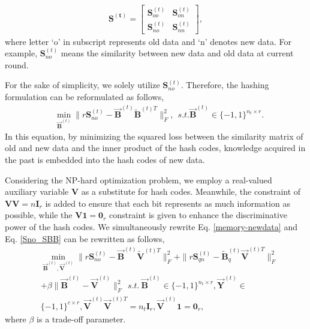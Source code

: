 \documentclass[final]{beamer}
\newlength{\colwidth}
\begin{document}
\begin{frame}[t]
\begin{columns}[t]
\begin{column}{\colwidth}
					\begin{equation}
						\begin{aligned}
							\mathbf{S^{(t)}} = \begin{bmatrix}  \mathbf{S}_{oo}^{(t)}& \mathbf{S}_{on}^{(t)}\\  \mathbf{S}_{no}^{(t)}& \mathbf{S}_{nn}^{(t)}\end{bmatrix},
						\end{aligned}
						\label{S_online_scenario}
					\end{equation}
					where letter `o' in subscript represents old data and `n' denotes new data. For example, $\mathbf{S}_{no}^{(t)}$ means the similarity between new data and old data at current round.
					
					
					For the sake of simplicity, we solely utilize $\mathbf{S}_{no}^{(t)}$. Therefore, the hashing formulation can be reformulated as follows,
					\begin{equation}
						\begin{aligned}
							& \min_{\vec{\mathbf{B}}^{(t)}}	\| r\mathbf{S}_{no}^{(t)} - \vec{\mathbf{B}}^{(t)} \tilde{\mathbf{B}}^{(t)T} \|_{F}^{2}, \ \
							s.t. \vec{\mathbf{B}}^{(t)} \in \{-1,1\}^{n_{t} \times r}.
						\end{aligned}
						\label{Sno_SBB}
					\end{equation}
					In this equation, by minimizing the squared loss between the similarity matrix of old and new data and the inner product of the hash codes, knowledge acquired in the past is embedded into the hash codes of new data.
					
					Considering the NP-hard optimization problem, we employ a real-valued auxiliary variable $\mathbf{V}$ as a substitute for hash codes. Meanwhile, the constraint of $\mathbf{V} \mathbf{V} = n \mathbf{I}_{r}$ is added to ensure that each bit represents as much information as possible, while the $\mathbf{V}\mathbf{1} = \mathbf{0}_{r}$ constraint is given to enhance the discriminative power of the hash codes. We simultaneously rewrite Eq. \eqref{memory-newdata} and Eq. \eqref{Sno_SBB} can be rewritten as follows,
					\begin{equation}
						\begin{aligned}
							&\min_{\vec{\mathbf{B}}^{(t)},\vec{\mathbf{V}}^{(t)}} \| r\mathbf{S}_{no}^{(t)} - \vec{\mathbf{B}}^{(t)} \tilde{\mathbf{V}}^{(t)T} \|_{F}^{2} + \| r\mathbf{S}_{qn}^{(t)} - \tilde{\mathbf{B}}^{(t)}_{q} \vec{\mathbf{V}}^{(t)T} \|_{F}^{2} \\
							&+ \beta \| \vec{\mathbf{B}}^{(t)} -\vec{\mathbf{V}}^{(t)} \|_{F}^{2} \ \  s.t. \  \vec{\mathbf{B}}^{(t)} \in \{-1,1\}^{n_{t} \times r},\vec{\mathbf{Y}}^{(t)} \in  \\
							&  \{-1, 1\}^{c \times r},  \vec{\mathbf{V}}^{(t)}\vec{\mathbf{V}}^{(t)T} = n_{t} \mathbf{I}_{r}, \vec{\mathbf{V}}^{(t)}\mathbf{1} = \mathbf{0}_{r},
						\end{aligned}
						\label{hashformulation}
					\end{equation}
					where $\beta$ is a trade-off parameter.
					

\end{column}
\end{columns}
\end{frame}
\end{document}
